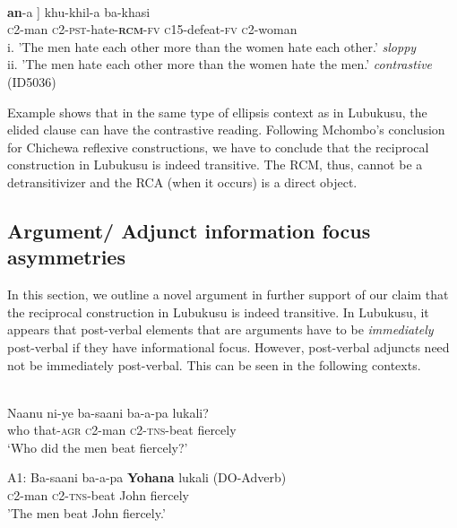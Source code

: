 \documentclass[output=paper]{langsci/langscibook}
\begin{document}
\ea\label{ex:}
\\
\gll {[ba-saani   ba-a-biyil-}\textbf{{an}}{-a ]   khu-khil-a   ba-khasi} \\
\textsc{c}2-man   \textsc{c2-pst}-hate-\textbf{\textsc{rcm}}\textsc{-fv}   \textsc{c}15-defeat-\textsc{fv}   \textsc{c}2-woman  \\
\glt i. 'The men hate each other more than the women hate each other.'  \textit{sloppy} \\
\glt ii. 'The men hate each other more than the women hate the men.'  \textit{contrastive}                       (ID5036)\\
\z

Example  shows that in the same type of ellipsis context as in Lubukusu, the elided clause can have the contrastive reading. Following Mchombo's conclusion for Chichewa reflexive constructions, we have to conclude that the reciprocal construction in Lubukusu is indeed transitive. The RCM, thus, cannot be a detransitivizer and the RCA (when it occurs) is a direct object.

\subsection{Argument/ Adjunct information focus asymmetries}

  In this section, we outline a novel argument in further support of our claim that the reciprocal construction in Lubukusu is indeed transitive. In Lubukusu, it appears that post-verbal elements that are arguments have to be \textit{immediately} post-verbal if they have informational focus. However, post-verbal adjuncts need not be immediately post-verbal. This can be seen in the following contexts.



\ea\label{ex:}
  \\
\gll Naanu  ni-ye    ba-saani   ba-a-pa   lukali? \\
who  that-\textsc{agr}   \textsc{c}2-man   \textsc{c}2-\textsc{tns}-beat   fiercely \\
\glt ‘Who did the men beat fiercely?’ \\
\z


\ea\label{ex:}
\gll A1:  Ba-saani  ba-a-pa  \textbf{{Yohana}}{  lukali}     (DO-Adverb) \\
       \textsc{c}2-man   \textsc{c2-tns}-beat   John     fiercely\\
\glt    'The men beat John fiercely.'
\end{document}
